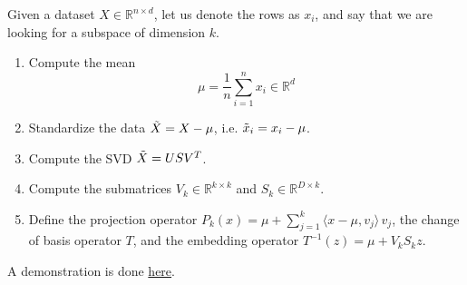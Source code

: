   \begin{algo} 
    Given a dataset $X \in \mathbb{R}^{n \times d}$, let us denote the rows as $x_i$, and say that we are looking for a subspace of dimension $k$. 
    \begin{enumerate}
      \item Compute the mean 
      \begin{equation}
        \mu = \frac{1}{n} \sum_{i=1}^n x_i  \in \mathbb{R}^d
      \end{equation} 

      \item Standardize the data $\Tilde{X} = X - \mu$, i.e. $\Tilde{x}_i = x_i - \mu$.  

      \item Compute the SVD $\Tilde{X} = U S V^T$.

      \item Compute the submatrices $V_k \in \mathbb{R}^{k \times k}$ and $S_k \in \mathbb{R}^{D \times k}$. 

      \item Define the projection operator $P_k (x) = \mu + \sum_{j=1}^k \langle x - \mu, v_j \rangle \, v_j$, the change of basis operator $T$, and the embedding operator $T^{-1} (z) = \mu + V_k S_k z$. 
    \end{enumerate} 
    A demonstration is done \href{code/pca.html}{here}.
  \end{algo}

